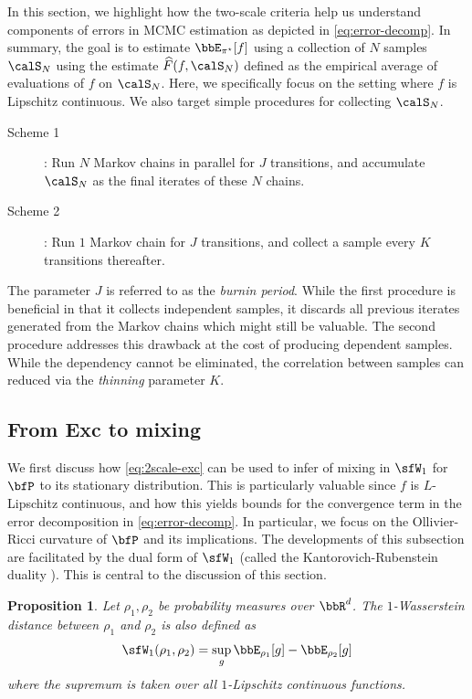 \documentclass[11pt]{article}
\newtheorem{proposition}{Proposition}[section]
\newcounter{ct}
\begin{document}
In this section, we highlight how the two-scale criteria help us understand components of errors in MCMC estimation as depicted in \cref{eq:error-decomp}.
In summary, the goal is to estimate \(\bbE_{\pi^{\star}}[f]\) using a collection of \(N\) samples \(\calS_{N}\) using the estimate \(\widehat{F}(f, \calS_{N})\) defined as the empirical average of evaluations of \(f\) on \(\calS_{N}\).
Here, we specifically focus on the setting where \(f\) is Lipschitz continuous.
We also target simple procedures for collecting \(\calS_{N}\).
\begin{description}
    \item [Scheme 1]: Run \(N\) Markov chains in parallel for \(J\) transitions, and accumulate \(\calS_{N}\) as the final iterates of these \(N\) chains.
    \item [Scheme 2]: Run \(1\) Markov chain for \(J\) transitions, and collect a sample every \(K\) transitions thereafter.
\end{description}
The parameter \(J\) is referred to as the \emph{burnin period}.
While the first procedure is beneficial in that it collects independent samples, it discards all previous iterates generated from the Markov chains which might still be valuable.
The second procedure addresses this drawback at the cost of producing dependent samples.
While the dependency cannot be eliminated, the correlation between samples can reduced via the \emph{thinning} parameter \(K\).

\subsection{From \textsf{Exc} to mixing}

We first discuss how \ref{eq:2scale-exc} can be used to infer of mixing in \(\sfW_{1}\) for \(\bfP\) to its stationary distribution.
This is particularly valuable since \(f\) is \(L\)-Lipschitz continuous, and how this yields bounds for the convergence term in the error decomposition in \cref{eq:error-decomp}.
In particular, we focus on the Ollivier-Ricci curvature of \(\bfP\) and its implications.
The developments of this subsection are facilitated by the dual form of \(\sfW_{1}\) (called the Kantorovich-Rubenstein duality \citep[Eq. 5.11]{villani2009optimal}).
This is central to the discussion of this section.
\begin{proposition}
\label{prop:W1-dual}
    Let \(\rho_{1}, \rho_{2}\) be probability measures over \(\bbR^{d}\).
    The \(1\)-Wasserstein distance between \(\rho_{1}\) and \(\rho_{2}\) is also defined as
    \begin{equation*}
        \sfW_{1}(\rho_{1}, \rho_{2}) = \sup_{g} \bbE_{\rho_{1}}[g] - \bbE_{\rho_{2}}[g]
    \end{equation*}
    where the supremum is taken over all \(1\)-Lipschitz continuous functions.
\end{proposition}
\end{document}
